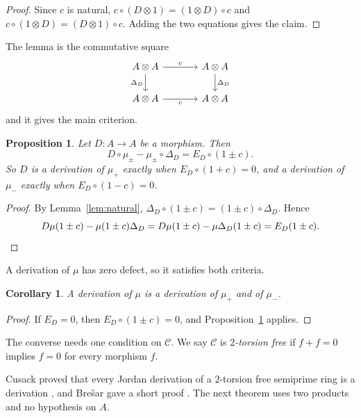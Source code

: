 \documentclass[]{interact}
\theoremstyle{plain}
\newtheorem{corollary}[theorem]{Corollary}
\newtheorem{proposition}[theorem]{Proposition}
\theoremstyle{definition}
\theoremstyle{remark}
\begin{document}
\begin{proof}
Since $c$ is natural, $c \circ (D \otimes 1) = (1 \otimes D) \circ c$ and $c \circ (1 \otimes D) = (D \otimes 1) \circ c$.
Adding the two equations gives the claim.
\end{proof}

The lemma is the commutative square
\[
\begin{tikzcd}[column sep=large]
A \otimes A \arrow[r, "c"] \arrow[d, "\Delta_D"'] & A \otimes A \arrow[d, "\Delta_D"] \\
A \otimes A \arrow[r, "c"'] & A \otimes A
\end{tikzcd}
\]
and it gives the main criterion.

\begin{proposition}\label{prop:defect-sym}
Let $D \colon A \to A$ be a morphism. Then
\[
D \circ \mu_{\pm} - \mu_{\pm} \circ \Delta_D = E_D \circ (1 \pm c).
\]
So $D$ is a derivation of $\mu_+$ exactly when $E_D \circ (1 + c) = 0$, and a derivation of $\mu_-$ exactly when $E_D \circ (1 - c) = 0$.
\end{proposition}

\begin{proof}
By Lemma~\ref{lem:natural}, $\Delta_D \circ (1 \pm c) = (1 \pm c) \circ \Delta_D$.
Hence
\[
D \mu (1 \pm c) - \mu (1 \pm c) \Delta_D = D \mu (1 \pm c) - \mu \Delta_D (1 \pm c) = E_D (1 \pm c). \qedhere
\]
\end{proof}

A derivation of $\mu$ has zero defect, so it satisfies both criteria.

\begin{corollary}\label{cor:inclusion}
A derivation of $\mu$ is a derivation of $\mu_+$ and of $\mu_-$.
\end{corollary}

\begin{proof}
If $E_D = 0$, then $E_D \circ (1 \pm c) = 0$, and Proposition~\ref{prop:defect-sym} applies.
\end{proof}

The converse needs one condition on $\mathcal{C}$. %
We say $\mathcal{C}$ is \emph{$2$-torsion free} if $f + f = 0$ implies $f = 0$ for every morphism $f$. %

Cusack proved that every Jordan derivation of a $2$-torsion free semiprime ring is a derivation \citep[Theorem 4 and Corollary 5]{Cusack1975}, and Bre\v{s}ar gave a short proof \citep[Theorem 1]{Bresar1988}.
The next theorem uses two products and no hypothesis on $A$. %
\end{document}
